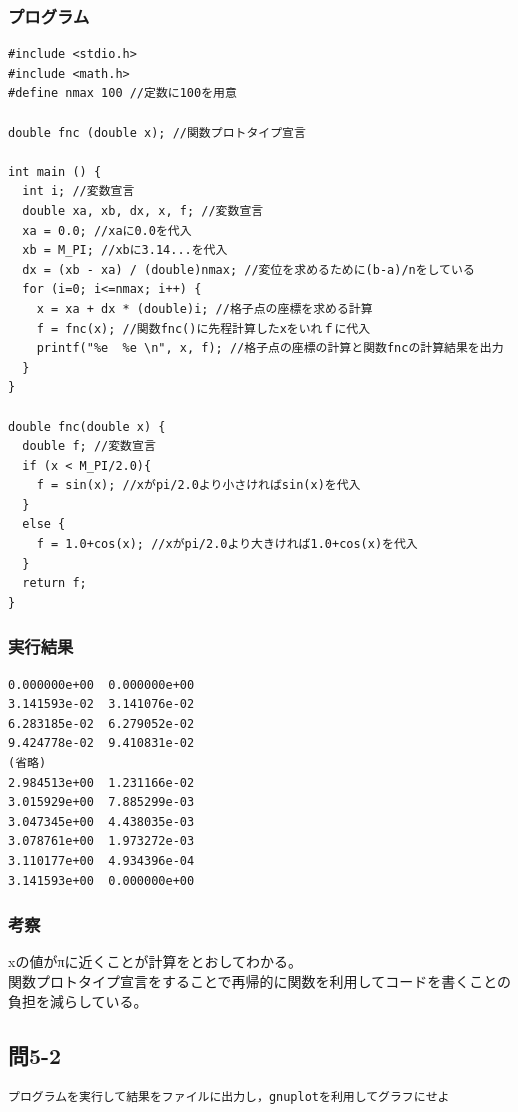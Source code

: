 \documentclass{jarticle}
\begin{document}
\subsubsection{プログラム\\}
\begin{breakbox}
\begin{verbatim}
#include <stdio.h>
#include <math.h>
#define nmax 100 //定数に100を用意

double fnc (double x); //関数プロトタイプ宣言

int main () {
  int i; //変数宣言
  double xa, xb, dx, x, f; //変数宣言
  xa = 0.0; //xaに0.0を代入
  xb = M_PI; //xbに3.14...を代入
  dx = (xb - xa) / (double)nmax; //変位を求めるために(b-a)/nをしている
  for (i=0; i<=nmax; i++) {
    x = xa + dx * (double)i; //格子点の座標を求める計算
    f = fnc(x); //関数fnc()に先程計算したxをいれｆに代入
    printf("%e  %e \n", x, f); //格子点の座標の計算と関数fncの計算結果を出力
  }
}

double fnc(double x) {
  double f; //変数宣言
  if (x < M_PI/2.0){
    f = sin(x); //xがpi/2.0より小さければsin(x)を代入
  }
  else {
    f = 1.0+cos(x); //xがpi/2.0より大きければ1.0+cos(x)を代入
  }
  return f;
}
\end{verbatim}
\end{breakbox}
\subsubsection{実行結果\\}
\begin{breakbox}
\begin{verbatim}
0.000000e+00  0.000000e+00 
3.141593e-02  3.141076e-02 
6.283185e-02  6.279052e-02 
9.424778e-02  9.410831e-02 
(省略)
2.984513e+00  1.231166e-02 
3.015929e+00  7.885299e-03 
3.047345e+00  4.438035e-03 
3.078761e+00  1.973272e-03 
3.110177e+00  4.934396e-04 
3.141593e+00  0.000000e+00 
\end{verbatim}
\end{breakbox}
\subsubsection{考察\\}
xの値がπに近くことが計算をとおしてわかる。\\
関数プロトタイプ宣言をすることで再帰的に関数を利用してコードを書くことの負担を減らしている。\\

\subsection{問5-2\\}
\begin{verbatim}
プログラムを実行して結果をファイルに出力し，gnuplotを利用してグラフにせよ
\end{verbatim}
\end{document}
